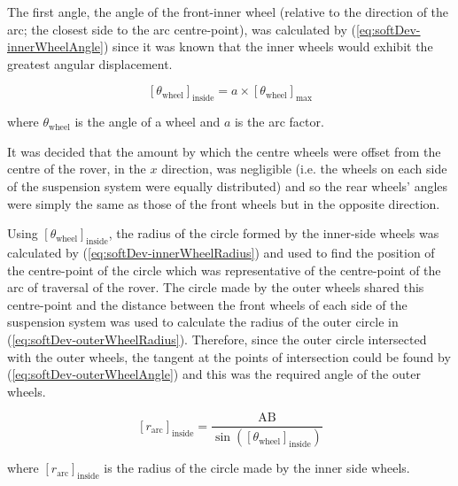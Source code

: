         The first angle, the angle of the front-inner wheel (relative to the direction of the arc; the closest side to the arc centre-point), was calculated by (\ref{eq:softDev-innerWheelAngle}) since it was known that the inner wheels would exhibit the greatest angular displacement.
        
        \begin{equation}
          \label{eq:softDev-innerWheelAngle}
          \left[\theta_{\text{wheel}}\right]_{\text{inside}} = a\times \left[\theta_{\text{wheel}}\right]_{\text{max}}
        \end{equation}
        
        \begin{flushright}
          where $\theta_{\text{wheel}}$ is the angle of a wheel and $a$ is the arc factor.
        \end{flushright}
        
        It was decided that the amount by which the centre wheels were offset from the centre of the rover, in the $x$ direction, was negligible (i.e. the wheels on each side of the suspension system were equally distributed) and so the rear wheels' angles were simply the same as those of the front wheels but in the opposite direction.
        
        Using $\left[\theta_{\text{wheel}}\right]_{\text{inside}}$, the radius of the circle formed by the inner-side wheels was calculated by (\ref{eq:softDev-innerWheelRadius}) and used to find the position of the centre-point of the circle which was representative of the centre-point of the arc of traversal of the rover. The circle made by the outer wheels shared this centre-point and the distance between the front wheels of each side of the suspension system was used to calculate the radius of the outer circle in (\ref{eq:softDev-outerWheelRadius}). Therefore, since the outer circle intersected with the outer wheels, the tangent at the points of intersection could be found by (\ref{eq:softDev-outerWheelAngle}) and this was the required angle of the outer wheels.
        
        \begin{equation}
          \label{eq:softDev-innerWheelRadius}
          \left[r_{\text{arc}}\right]_{\text{inside}} = \frac{\text{AB}}{\sin\left(\left[\theta_{\text{wheel}}\right]_{\text{inside}}\right)}
        \end{equation}
        \begin{flushright}
          where $\left[r_{\text{arc}}\right]_{\text{inside}}$ is the radius of the circle made by the inner side wheels.
        \end{flushright}
        
